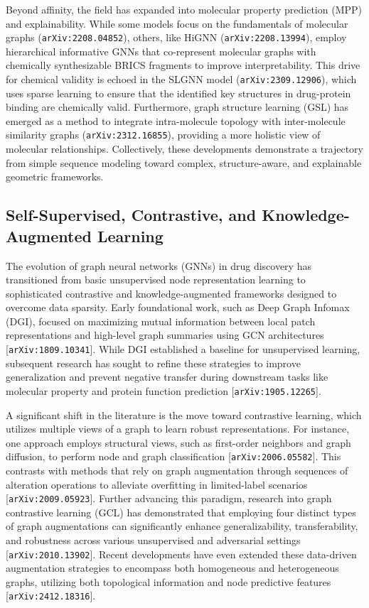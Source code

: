 \documentclass[11pt]{article}
\begin{document}
Beyond affinity, the field has expanded into molecular property prediction (MPP) and explainability. While some models focus on the fundamentals of molecular graphs (\texttt{arXiv:2208.04852}), others, like HiGNN (\texttt{arXiv:2208.13994}), employ hierarchical informative GNNs that co-represent molecular graphs with chemically synthesizable BRICS fragments to improve interpretability. This drive for chemical validity is echoed in the SLGNN model (\texttt{arXiv:2309.12906}), which uses sparse learning to ensure that the identified key structures in drug-protein binding are chemically valid. Furthermore, graph structure learning (GSL) has emerged as a method to integrate intra-molecule topology with inter-molecule similarity graphs (\texttt{arXiv:2312.16855}), providing a more holistic view of molecular relationships. Collectively, these developments demonstrate a trajectory from simple sequence modeling toward complex, structure-aware, and explainable geometric frameworks.

\subsection{Self-Supervised, Contrastive, and Knowledge-Augmented Learning}

The evolution of graph neural networks (GNNs) in drug discovery has transitioned from basic unsupervised node representation learning to sophisticated contrastive and knowledge-augmented frameworks designed to overcome data sparsity. Early foundational work, such as Deep Graph Infomax (DGI), focused on maximizing mutual information between local patch representations and high-level graph summaries using GCN architectures [\texttt{arXiv:1809.10341}]. While DGI established a baseline for unsupervised learning, subsequent research has sought to refine these strategies to improve generalization and prevent negative transfer during downstream tasks like molecular property and protein function prediction [\texttt{arXiv:1905.12265}].

A significant shift in the literature is the move toward contrastive learning, which utilizes multiple views of a graph to learn robust representations. For instance, one approach employs structural views, such as first-order neighbors and graph diffusion, to perform node and graph classification [\texttt{arXiv:2006.05582}]. This contrasts with methods that rely on graph augmentation through sequences of alteration operations to alleviate overfitting in limited-label scenarios [\texttt{arXiv:2009.05923}]. Further advancing this paradigm, research into graph contrastive learning (GCL) has demonstrated that employing four distinct types of graph augmentations can significantly enhance generalizability, transferability, and robustness across various unsupervised and adversarial settings [\texttt{arXiv:2010.13902}]. Recent developments have even extended these data-driven augmentation strategies to encompass both homogeneous and heterogeneous graphs, utilizing both topological information and node predictive features [\texttt{arXiv:2412.18316}].
\end{document}
